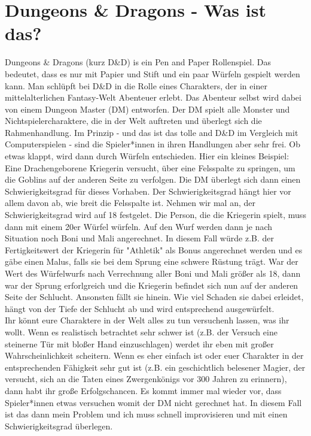 \documentclass[a4paper]{article}
\begin{document}
\section*{Dungeons \& Dragons - Was ist das?}
Dungeons \& Dragons (kurz D\&D) is ein Pen and Paper Rollenspiel. Das
bedeutet, dass es nur mit Papier und Stift und ein paar Würfeln gespielt
werden kann. Man schlüpft bei D\&D in die Rolle eines Charakters, der in einer
mittelalterlichen Fantasy-Welt Abenteuer erlebt. Das Abenteur selbst wird
dabei von einem Dungeon Master (DM) entworfen. Der DM spielt alle Monster und
Nichtspielercharaktere, die in der Welt auftreten und überlegt sich die
Rahmenhandlung. Im Prinzip - und das ist das tolle and D\&D im Vergleich mit
Computerspielen - sind die Spieler*innen in ihren Handlungen aber sehr frei.
Ob etwas klappt, wird dann durch Würfeln entschieden. Hier ein kleines
Beispiel:\\
Eine Drachengeborene Kriegerin versucht, über eine Felsspalte zu springen, um
die Goblins auf der anderen Seite zu verfolgen. Die DM überlegt sich dann
einen Schwierigkeitsgrad für dieses Vorhaben. Der Schwierigkeitsgrad hängt
hier vor allem davon ab, wie breit die Felsspalte ist. Nehmen wir mal an, der
Schwierigkeitsgrad wird auf 18 festgelet. Die Person, die die Kriegerin
spielt, muss dann mit einem 20er Würfel würfeln. Auf den Wurf werden dann je
nach Situation noch Boni und Mali angerechnet. In diesem Fall würde z.B. der
Fertigkeitswert der Kriegerin für "Athletik" als Bonus angerechnet werden und
es gäbe einen Malus, falls sie bei dem Sprung eine schwere Rüstung trägt. War
der Wert des Würfelwurfs nach Verrechnung aller Boni und Mali größer als 18,
dann war der Sprung erforlgreich und die Kriegerin befindet sich nun auf der
anderen Seite der Schlucht. Ansonsten fällt sie hinein. Wie viel Schaden sie
dabei erleidet, hängt von der Tiefe der Schlucht ab und wird entsprechend
ausgewürfelt.\\
Ihr könnt eure Charaktere in der Welt alles zu tun versuchenh lassen, was ihr
wollt. Wenn es realistisch betrachtet sehr schwer ist (z.B. der Versuch eine
steinerne Tür mit bloßer Hand einzuschlagen) werdet ihr eben mit großer
Wahrscheinlichkeit scheitern. Wenn es eher einfach ist oder euer Charakter in
der entsprechenden Fähigkeit sehr gut ist (z.B. ein geschichtlich belesener
Magier, der versucht, sich an die Taten eines Zwergenkönigs vor 300 Jahren zu
erinnern), dann habt ihr große Erfolgschancen. Es kommt immer mal wieder vor,
dass Spieler*innen etwas versuchen womit der DM nicht gerechnet hat. In diesem
Fall ist das dann mein Problem und ich muss schnell improvisieren und mit
einen Schwierigkeitsgrad überlegen.
\end{document}
